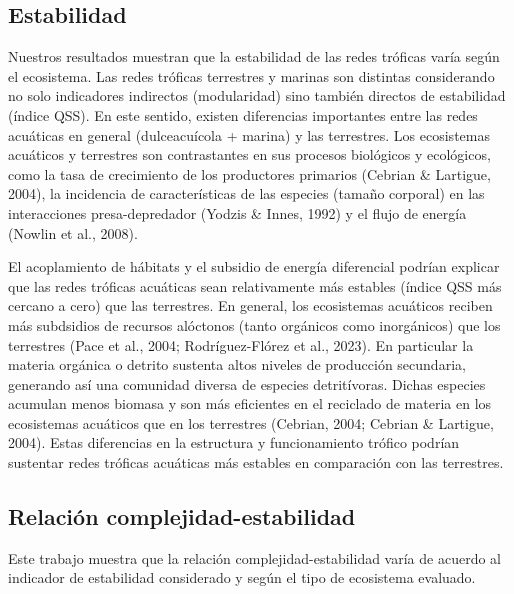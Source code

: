 \documentclass[
]{article}
\begin{document}
\hypertarget{estabilidad}{%
\subsection{Estabilidad}\label{estabilidad}}

Nuestros resultados muestran que la estabilidad de las redes tróficas
varía según el ecosistema. Las redes tróficas terrestres y marinas son
distintas considerando no solo indicadores indirectos (modularidad) sino
también directos de estabilidad (índice QSS). En este sentido, existen
diferencias importantes entre las redes acuáticas en general
(dulceacuícola + marina) y las terrestres. Los ecosistemas acuáticos y
terrestres son contrastantes en sus procesos biológicos y ecológicos,
como la tasa de crecimiento de los productores primarios (Cebrian \&
Lartigue, 2004), la incidencia de características de las especies
(tamaño corporal) en las interacciones presa-depredador (Yodzis \&
Innes, 1992) y el flujo de energía (Nowlin et al., 2008).

El acoplamiento de hábitats y el subsidio de energía diferencial podrían
explicar que las redes tróficas acuáticas sean relativamente más
estables (índice QSS más cercano a cero) que las terrestres. En general,
los ecosistemas acuáticos reciben más subdsidios de recursos alóctonos
(tanto orgánicos como inorgánicos) que los terrestres (Pace et al.,
2004; Rodríguez-Flórez et al., 2023). En particular la materia orgánica
o detrito sustenta altos niveles de producción secundaria, generando así
una comunidad diversa de especies detritívoras. Dichas especies acumulan
menos biomasa y son más eficientes en el reciclado de materia en los
ecosistemas acuáticos que en los terrestres (Cebrian, 2004; Cebrian \&
Lartigue, 2004). Estas diferencias en la estructura y funcionamiento
trófico podrían sustentar redes tróficas acuáticas más estables en
comparación con las terrestres.

\hypertarget{relaciuxf3n-complejidad-estabilidad-1}{%
\subsection{Relación
complejidad-estabilidad}\label{relaciuxf3n-complejidad-estabilidad-1}}

Este trabajo muestra que la relación complejidad-estabilidad varía de
acuerdo al indicador de estabilidad considerado y según el tipo de
ecosistema evaluado.
\end{document}
